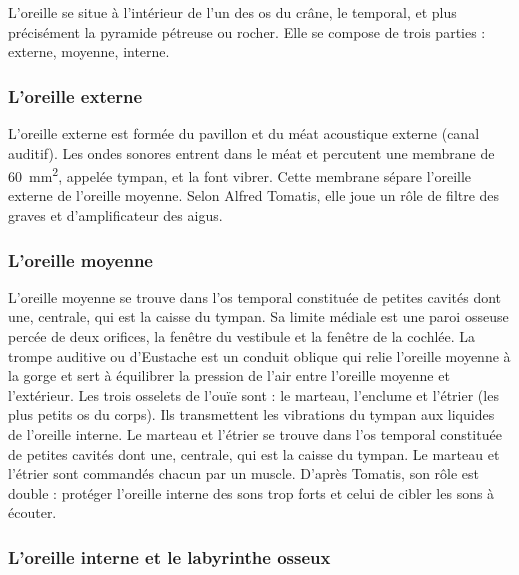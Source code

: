L'oreille\autocite[ch. 8 pp. 319--321]{marieb:biologie} 
se situe à l'intérieur de l'un des os du crâne, le temporal, et plus précisément la pyramide pétreuse ou rocher. Elle se compose de trois parties : externe, moyenne, interne.

\subsubsection{L'oreille externe}

L'oreille externe\autocite[ch. 8, pp. 319--321.]{marieb:biologie}
est formée du pavillon et du méat acoustique externe
	(canal auditif). Les ondes sonores entrent dans le méat et percutent
	une membrane de \SI{60}{\milli\metre\squared}, appelée tympan, et la font vibrer. 
	Cette membrane
	sépare l'oreille externe de l'oreille moyenne. 
	Selon Alfred Tomatis,
	elle joue un rôle de filtre des graves et d'amplificateur des aigus.




\subsubsection{L'oreille moyenne}

L'oreille moyenne se trouve dans l'os temporal constituée de petites
cavités dont une, centrale, qui est la caisse du tympan. Sa limite
médiale est une paroi osseuse percée de deux orifices, la fenêtre
du vestibule et la fenêtre de la cochlée. La trompe auditive ou d'Eustache
est un conduit oblique qui relie l'oreille moyenne à la gorge et sert
à équilibrer la pression de l'air entre l'oreille moyenne et l'extérieur.
Les trois osselets de l'ouïe sont : le marteau, l'enclume et l'étrier
(les plus petits os du corps). Ils transmettent les vibrations du
tympan aux liquides de l'oreille interne. Le marteau et l'étrier se
trouve dans l'os temporal constituée de petites cavités dont une,
centrale, qui est la caisse du tympan. 
Le marteau et l'étrier sont commandés chacun par un muscle. D'après
Tomatis, son rôle est double : protéger l'oreille interne des sons
trop forts et celui de cibler les sons à écouter.

\subsubsection{L'oreille interne et le labyrinthe osseux}

